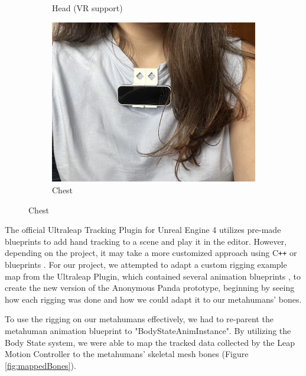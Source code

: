 \begin{figure}[!htb]
\begin{minipage}{\linewidth}
\begin{subfigure}{0.4\textwidth}
            \caption{Head (VR support) \cite{LEAPVR}}
        \end{subfigure}
        \begin{subfigure}{0.4\textwidth}
            \includegraphics[width=\linewidth]{figures/CMD.jpg}
            \centering
            \caption{Chest}
        \end{subfigure}
        \label{fig:CMDvsHMD}
	\end{minipage}
\end{figure}

The official Ultraleap Tracking Plugin for Unreal Engine 4 utilizes pre-made blueprints to add hand tracking to a scene and play it in the editor. However, depending on the project, it may take a more customized approach using C\texttt{+}\texttt{+} or blueprints \cite{ULTGIT}. For our project, we attempted to adapt a custom rigging example map from the Ultraleap Plugin, which contained several animation blueprints \cite{LEAPMOD}, to create the new version of the Anonymous Panda prototype, beginning by seeing how each rigging was done and how we could adapt it to our metahumans' bones.

To use the rigging on our metahumans effectively, we had to re-parent the metahuman animation blueprint to "BodyStateAnimInstance". By utilizing the Body State system, we were able to map the tracked data collected by the Leap Motion Controller to the metahumans' skeletal mesh bones (Figure \ref{fig:mappedBones}).

